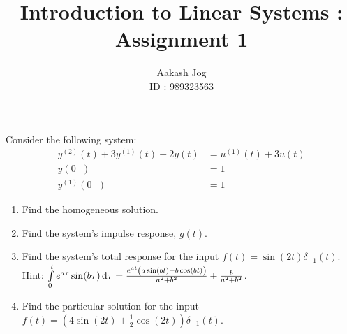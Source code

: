 \documentclass[fleqn, a4paper, 11pt, oneside]{amsart}
\title{Introduction to Linear Systems : Assignment 1}
\author
{
	Aakash Jog\\
	ID : 989323563
}
\date{\formatdate{22}{10}{2015}}
\theoremstyle{definition}
\theoremstyle{theorem}
\begin{document}

\maketitle

\begin{question}
	Consider the following system:
	\begin{align*}
		y^{(2)}(t) + 3 y^{(1)}(t) + 2 y(t) & = u^{(1)}(t) + 3 u(t) \\
		y(0^-)                             & = 1                   \\
		y^{(1)}(0^-)                       & = 1
	\end{align*}
	\begin{enumerate}
		\item
			Find the homogeneous solution.
		\item
			Find the system's impulse response, $g(t)$.
		\item
			Find the system's total response for the input $f(t) = \sin(2 t) \delta_{-1}(t)$.
			Hint: $\int\limits_{0}^{t} e^{a \tau} \sin(b \tau) \dif \tau = \frac{e^{a t} \left( a \sin(b t) - b \cos(b t) \right)}{a^2 + b^2} + \frac{b}{a^2 + b^2}$.
		\item
			Find the particular solution for the input $f(t) = \left( 4 \sin(2 t) + \frac{1}{2} \cos(2 t) \right) \delta_{-1}(t)$.
	\end{enumerate}
\end{question}
\end{document}
